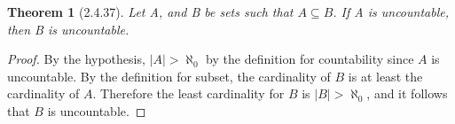 \documentclass[a4paper, 12pt]{article}
\theoremstyle{plain}
\newtheorem*{theorem*}{Theorem}
\begin{document}
	
	\begin{theorem*}[2.4.37]
		Let A, and B be sets such that $A \subseteq B$. If A is \newline uncountable, then B is uncountable.
	\end{theorem*}
	
	\begin{proof}
		By the hypothesis, $|A| > \aleph_0$ by the definition for countability since $A$ is uncountable. By the definition for subset, the cardinality of $B$ is at least the cardinality of $A$. Therefore the least cardinality for $B$ is $|B| > \aleph_0$, and it follows that $B$ is uncountable.
	\end{proof}
\end{document}
